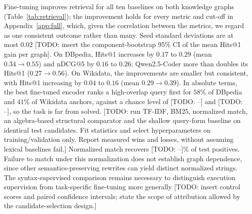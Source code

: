 \documentclass[runningheads]{llncs}
\newcommand{\hp}[1]{{\color{red!75!black}#1}}
\begin{document}


Fine-tuning improves retrieval for all ten baselines on both knowledge graphs
(Table~\ref{tab:retrieval}); the improvement holds for every metric and
cut-off in Appendix~\ref{app:full}, which, given the correlation between the
metrics, we regard as one consistent outcome rather than many. Seed standard
deviations are at most $0.02$ \hp{[TODO: insert the component-bootstrap 95\%
CI of the mean Hits@1 gain per graph]}. On DBpedia,
Hits@1 increases by $0.17$ to $0.29$ (mean $0.34 \rightarrow 0.55$) and nDCG@5
by $0.16$ to $0.26$; Qwen2.5-Coder more than doubles its Hits@1
($0.27 \rightarrow 0.56$). On Wikidata, the improvements are smaller but
consistent, with Hits@1 increasing by $0.04$ to $0.16$ (mean
$0.29 \rightarrow 0.39$). In absolute terms, the best fine-tuned encoder ranks
a high-overlap query first for $58\%$ of DBpedia and $41\%$ of Wikidata
anchors, against a chance level of \hp{[TODO: --]} and \hp{[TODO: --]}, so the
task is far from solved. \hp{[TODO: run TF-IDF, BM25, normalized match, an algebra-based structural
comparator and the shallow query-form baseline on identical test candidates.
Fit statistics and select hyperparameters on training/validation only.
Report measured wins and losses, without assuming lexical baselines fail.]}
Normalized match recovers \hp{[TODO: --]}\% of test positives. Failure to match
under this normalization does not establish graph dependence, since other
semantics-preserving rewrites can yield distinct normalized strings.
The syntax-supervised comparison remains necessary to distinguish execution
supervision from task-specific fine-tuning more generally
\hp{[TODO: insert control scores and paired confidence intervals; state the
scope of attribution allowed by the candidate-selection design.]}
\end{document}
